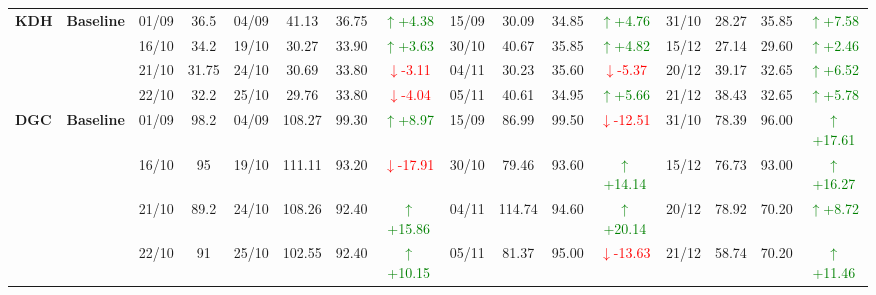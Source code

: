 {\begin{longtable}{llcc|cccc|cccc|cccc}
\multirow{4}{*}{\textbf{KDH}}
& \textbf{Baseline}
& 01/09 & 36.5 & 04/09 & 41.13 & 36.75 & \textcolor{green}{\(\uparrow\)+4.38} & 15/09 & 30.09 & 34.85 & \textcolor{green}{\(\uparrow\)+4.76} & 31/10 & 28.27 & 35.85 & \textcolor{green}{\(\uparrow\)+7.58} \\
& & 16/10 & 34.2 & 19/10 & 30.27 & 33.90 & \textcolor{green}{\(\uparrow\)+3.63} & 30/10 & 40.67 & 35.85 & \textcolor{green}{\(\uparrow\)+4.82} & 15/12 & 27.14 & 29.60 & \textcolor{green}{\(\uparrow\)+2.46} \\
& & 21/10 & 31.75 & 24/10 & 30.69 & 33.80 & \textcolor{red}{\(\downarrow\)-3.11} & 04/11 & 30.23 & 35.60 & \textcolor{red}{\(\downarrow\)-5.37} & 20/12 & 39.17 & 32.65 & \textcolor{green}{\(\uparrow\)+6.52} \\
& & 22/10 & 32.2 & 25/10 & 29.76 & 33.80 & \textcolor{red}{\(\downarrow\)-4.04} & 05/11 & 40.61 & 34.95 & \textcolor{green}{\(\uparrow\)+5.66} & 21/12 & 38.43 & 32.65 & \textcolor{green}{\(\uparrow\)+5.78} \\
\midrule

\multirow{4}{*}{\textbf{DGC}}
& \textbf{Baseline}
& 01/09 & 98.2 & 04/09 & 108.27 & 99.30 & \textcolor{green}{\(\uparrow\)+8.97} & 15/09 & 86.99 & 99.50 & \textcolor{red}{\(\downarrow\)-12.51} & 31/10 & 78.39 & 96.00 & \textcolor{green}{\(\uparrow\)+17.61} \\
& & 16/10 & 95 & 19/10 & 111.11 & 93.20 & \textcolor{red}{\(\downarrow\)-17.91} & 30/10 & 79.46 & 93.60 & \textcolor{green}{\(\uparrow\)+14.14} & 15/12 & 76.73 & 93.00 & \textcolor{green}{\(\uparrow\)+16.27} \\
& & 21/10 & 89.2 & 24/10 & 108.26 & 92.40 & \textcolor{green}{\(\uparrow\)+15.86} & 04/11 & 114.74 & 94.60 & \textcolor{green}{\(\uparrow\)+20.14} & 20/12 & 78.92 & 70.20 & \textcolor{green}{\(\uparrow\)+8.72} \\
& & 22/10 & 91 & 25/10 & 102.55 & 92.40 & \textcolor{green}{\(\uparrow\)+10.15} & 05/11 & 81.37 & 95.00 & \textcolor{red}{\(\downarrow\)-13.63} & 21/12 & 58.74 & 70.20 & \textcolor{green}{\(\uparrow\)+11.46} \\
\midrule


\end{longtable}}
